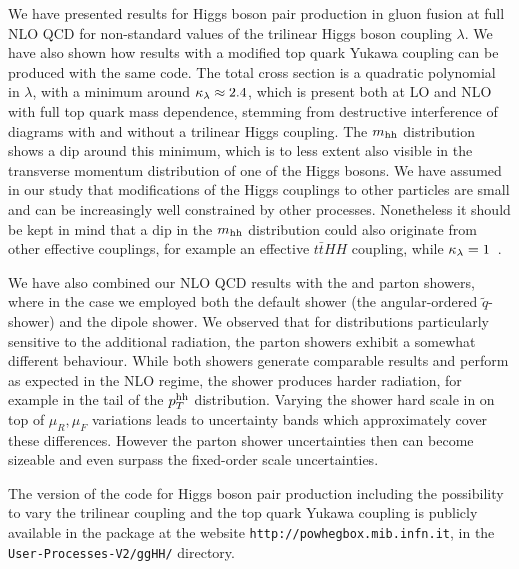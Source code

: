 We have presented results for Higgs boson pair production in gluon
fusion at full NLO QCD for non-standard values of the trilinear Higgs
boson coupling $\lambda$. We have also shown how results with a modified 
top quark Yukawa coupling can be produced with the same code.
The total cross section is a quadratic
polynomial in $\lambda$, with a minimum around $\kappa_{\lambda}\approx 2.4$,
which is present both at LO and NLO with full top quark mass
dependence, stemming from destructive interference of diagrams with
and without a trilinear Higgs coupling. 
The $m_{\mathrm{hh}}$ distribution shows a dip around this minimum, which is to
less extent also visible in the transverse momentum distribution of
one of the Higgs bosons. 
We have assumed in our study that modifications of the Higgs couplings
to other particles are small and can be increasingly well constrained by
other processes. Nonetheless it should be kept in mind that a dip in
the $m_{\mathrm{hh}}$ distribution could also originate from other effective
couplings, for example an effective $t\bar{t}HH$ coupling, while
$\kappa_{\lambda}= 1$~\cite{Buchalla:2018yce}.

We have also combined our NLO QCD results with the \pythia and \herwig
parton showers, where in the \herwig case we employed both the default 
shower (the angular-ordered $\tilde{q}$-shower) and the dipole shower.
We observed that for distributions particularly sensitive to the 
additional radiation, the parton showers exhibit a somewhat different 
behaviour. While both \herw showers generate comparable results and 
perform as expected in the NLO regime, the \pythia shower produces harder 
radiation, for example in the tail of the $p_T^{\mathrm{hh}}$
distribution. Varying the shower hard scale in \herwig on top of
$\mu_R,\mu_F$ variations leads to
uncertainty bands which approximately cover these 
differences. However the parton shower uncertainties 
then can become sizeable and even surpass the fixed-order scale uncertainties.

The \powheg{} version of the code for Higgs boson pair production
including the possibility to vary the trilinear coupling 
and the top quark Yukawa coupling 
is publicly available in the  package at the website
{\tt http://powhegbox.mib.infn.it}, in the
{\tt User-Processes-V2/ggHH/} directory.

